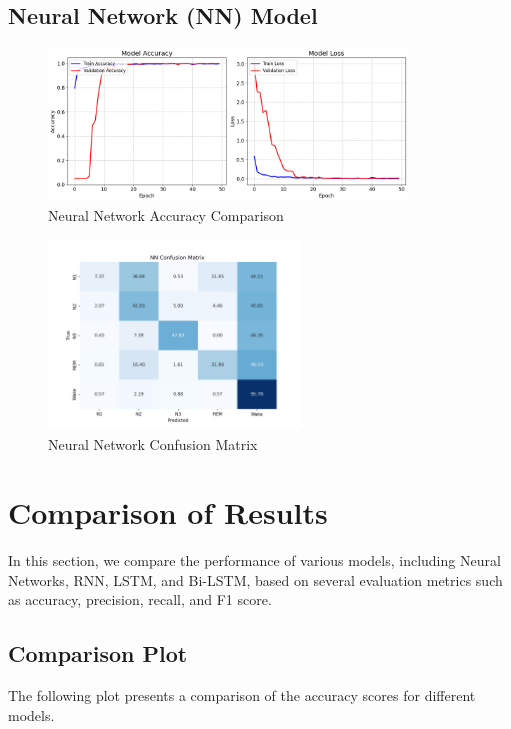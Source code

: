 \subsection{Neural Network (NN) Model}

\begin{figure}[H]
	\centering
	\includegraphics[width=0.85\textwidth]{img/paper_2/deeplearning.png}
	\caption{Neural Network Accuracy Comparison}
	\label{fig:nn_accuracy}
\end{figure}

\begin{figure}[H]
	\centering
	\includegraphics[width=0.6\textwidth]{img/paper_2/NN_cm.png}
	\caption{Neural Network Confusion Matrix}
	\label{fig:nn_cm}
\end{figure}



\section{Comparison of Results}

In this section, we compare the performance of various models, including Neural Networks, RNN, LSTM, and Bi-LSTM, based on several evaluation metrics such as accuracy, precision, recall, and F1 score.

\subsection{Comparison Plot}
The following plot presents a comparison of the accuracy scores for different models.

